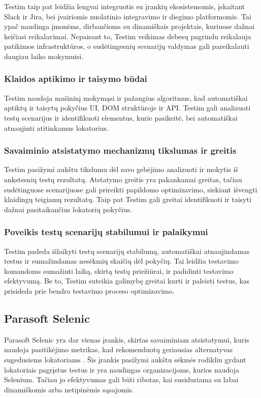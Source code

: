 \documentclass[
]{VUMIFPSkursinis}
\begin{document}
Testim taip pat leidžia lengvai integruotis su įrankių ekosistemomis, įskaitant Slack ir Jira, bei įvairiomis nuolatinio integravimo ir diegimo platformomis. Tai ypač naudinga įmonėms, dirbančioms su dinamiškais projektais, kuriuose dažnai keičiasi reikalavimai. Nepaisant to, Testim veikimas debesų pagrindu reikalauja patikimos infrastruktūros, o sudėtingesnių scenarijų valdymas gali pareikalauti daugiau laiko mokymuisi. \cite{Testim}

\subsubsection{Klaidos aptikimo ir taisymo būdai}

Testim naudoja mašininį mokymąsi ir pažangius algoritmus, kad automatiškai aptiktų ir taisytų pokyčius UI, DOM struktūroje ir API. Testim gali analizuoti testų scenarijus ir identifikuoti elementus, kurie pasikeitė, bei automatiškai atnaujinti atitinkamus lokatorius.

\subsubsection{Savaiminio atsistatymo mechanizmų tikslumas ir greitis}

Testim pasižymi aukštu tikslumu dėl savo gebėjimo analizuoti ir mokytis iš ankstesnių testų rezultatų. Atstatymo greitis yra pakankamai greitas, tačiau sudėtinguose scenarijuose gali prireikti papildomo optimizavimo, siekiant išvengti klaidingų teigiamų rezultatų. Taip pat Testim gali greitai identifikuoti ir taisyti dažnai pasitaikančius lokatorių pokyčius.

\subsubsection{Poveikis testų scenarijų stabilumui ir palaikymui}

Testim padeda išlaikyti testų scenarijų stabilumą, automatiškai atnaujindamas testus ir sumažindamas nesėkmių skaičių dėl pokyčių. Tai leidžia testavimo komandoms sumažinti laiką, skirtą testų priežiūrai, ir padidinti testavimo efektyvumą. Be to, Testim suteikia galimybę greitai kurti ir paleisti testus, kas prisideda prie bendro testavimo proceso optimizavimo.

\subsection{Parasoft Selenic}
Parasoft Selenic yra dar vienas įrankis, skirtas savaiminiam atsistatymui, kuris naudoja pasitikėjimo metrikas, kad rekomenduotų geriausias alternatyvas sugedusiems lokatoriams \cite{Garousi2024}. Šis įrankis pasižymi aukštu sėkmės rodikliu gydant lokatoriais pagrįstus testus ir yra naudingas organizacijoms, kurios naudoja Selenium. Tačiau jo efektyvumas gali būti ribotas, kai susiduriama su labai dinamiškomis arba netipinėmis sąsajomis. \cite{Selenic}
\end{document}
